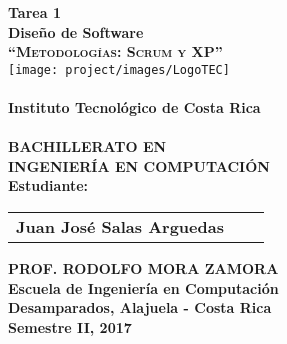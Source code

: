 \newpage
\begin{center}
\thispagestyle{empty}
\Large{\textbf{Tarea 1\\ \large{Diseño de Software}}}\\[0.7cm]
\LARGE{\textsc {\textbf{``Metodologías: Scrum y XP''}}}\\[0.5cm]
\vspace{0.5cm}
\texttt{[image: project/images/LogoTEC]}\\
\vspace{0.5cm}
\LARGE{\textbf{\\Instituto Tecnológico de Costa Rica\\}}
\vspace{1cm}
\Large{\textbf{\\BACHILLERATO EN\\INGENIERÍA EN COMPUTACIÓN}}
\vspace{1cm}
\Large{\textbf{\\Estudiante:}}\\[0.5cm]
\begin{table}[h]
\centering
\Large{
\begin{tabular}{>{\bfseries}lc>{\bfseries}r}
Juan José Salas Arguedas
\end{tabular}}
\end{table}
\vspace{0.5cm}
\large{\textbf{PROF. RODOLFO MORA ZAMORA}}\\
\vspace{1cm}
\large{\textbf{Escuela de Ingeniería en Computación}}\\
\large{\textbf{Desamparados, Alajuela - Costa Rica}}
\large{\textbf{\\Semestre II, 2017}}\\[0.5cm]
\vspace{1cm}
\newpage

\end{center}

